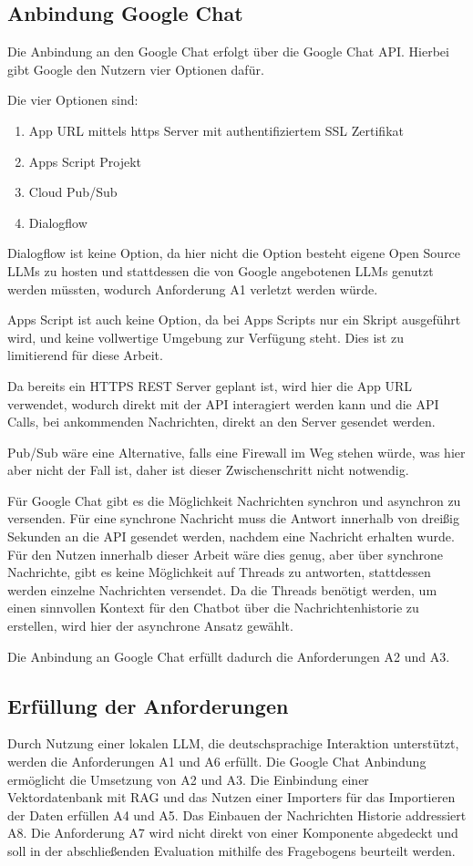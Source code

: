 \subsection{Anbindung Google Chat}
\label{s:konz:gchat}
Die Anbindung an den Google Chat erfolgt über die Google Chat API.
Hierbei gibt Google den Nutzern vier Optionen dafür.\par
Die vier Optionen sind:
\begin{enumerate}
    \item App URL mittels https Server mit authentifiziertem SSL Zertifikat
    \item Apps Script Projekt 
    \item Cloud Pub/Sub
    \item Dialogflow
\end{enumerate}
Dialogflow ist keine Option, da hier nicht die Option besteht 
 eigene Open Source LLMs zu hosten und stattdessen die von Google 
angebotenen LLMs genutzt werden müssten, wodurch Anforderung A1 verletzt werden 
würde. \par
Apps Script ist auch keine Option, da bei Apps Scripts nur ein Skript ausgeführt wird, 
und keine vollwertige Umgebung zur Verfügung steht. Dies ist zu limitierend für 
diese Arbeit.\par
Da bereits ein HTTPS REST Server geplant ist, wird hier die App URL verwendet, wodurch
direkt mit der API interagiert werden kann und die API Calls, bei ankommenden Nachrichten, 
direkt an den Server gesendet werden. \par
Pub/Sub wäre eine Alternative, falls eine Firewall im Weg stehen würde, was hier aber 
nicht der Fall ist, daher ist dieser Zwischenschritt nicht notwendig. \par
\par
Für Google Chat gibt es die Möglichkeit Nachrichten synchron und asynchron zu versenden.
Für eine synchrone Nachricht muss die Antwort innerhalb von dreißig Sekunden an die API 
gesendet werden, nachdem eine Nachricht erhalten wurde. Für den Nutzen innerhalb 
dieser Arbeit wäre dies genug, aber über synchrone Nachrichte, gibt es keine Möglichkeit 
auf Threads zu antworten, stattdessen werden einzelne Nachrichten versendet. Da die Threads
benötigt werden, um einen sinnvollen Kontext für den Chatbot über die Nachrichtenhistorie 
zu erstellen, wird hier der asynchrone Ansatz gewählt. \par
Die Anbindung an Google Chat erfüllt dadurch die Anforderungen A2 und A3.

\subsection{Erfüllung der Anforderungen}
Durch Nutzung einer lokalen LLM, die deutschsprachige Interaktion unterstützt, werden die Anforderungen A1 und A6 erfüllt. 
Die Google Chat Anbindung ermöglicht die Umsetzung von A2 und A3.
Die Einbindung einer Vektordatenbank mit RAG und das Nutzen einer Importers für das Importieren der Daten 
erfüllen A4 und A5. Das Einbauen der Nachrichten Historie addressiert A8. Die Anforderung A7 wird nicht direkt 
von einer Komponente abgedeckt und soll in der abschließenden
Evaluation mithilfe des Fragebogens beurteilt werden.
